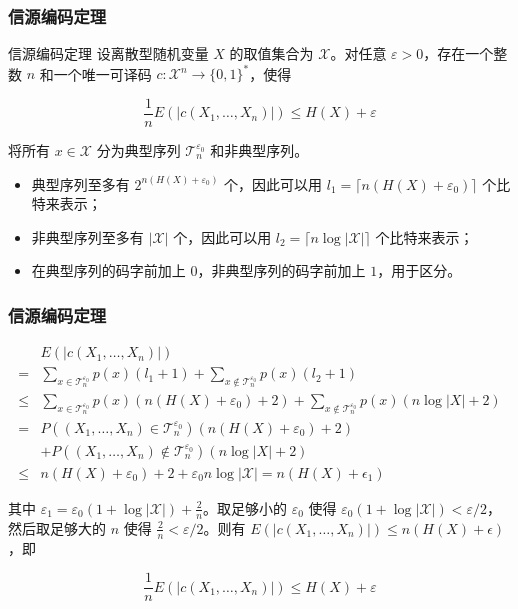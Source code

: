 \documentclass{beamer}
\begin{document}
\begin{frame}
    \frametitle{信源编码定理}

    \begin{block}{信源编码定理}
        设离散型随机变量 $X$ 的取值集合为 $\mathcal{X}$。对任意 $\varepsilon > 0$，存在一个整数 $n$ 和一个唯一可译码 $c: \mathcal{X}^n \rightarrow \{0, 1\}^*$，使得

        \[\frac{1}{n}E(\lvert c(X_1, \dots, X_n)\rvert) \leq H(X) + \varepsilon\]
    \end{block}
    
    将所有 $x\in \mathcal{X}$ 分为典型序列 $\mathcal{T}_n^{\varepsilon_0}$ 和非典型序列。

    \begin{itemize}
        \item 典型序列至多有 $2^{n(H(X) + \varepsilon_0)}$ 个，因此可以用 $l_1 = \lceil n(H(X) + \varepsilon_0)\rceil$ 个比特来表示；
        \item 非典型序列至多有 $\lvert \mathcal{X}\rvert$ 个，因此可以用 $l_2 = \lceil n\log \lvert \mathcal{X}\rvert\rceil$ 个比特来表示；
        \item 在典型序列的码字前加上 $0$，非典型序列的码字前加上 $1$，用于区分。
    \end{itemize}

\end{frame}

\begin{frame}
    \frametitle{信源编码定理}

    \[\begin{split}
        & E(\lvert c(X_1, \dots, X_n)\rvert) \\
        = & \sum_{x\in\mathcal{T}_n^{\varepsilon_0}}p(x)(l_1 + 1) + \sum_{x\notin\mathcal{T}_n^{\varepsilon_0}}p(x)(l_2 + 1) \\
        \leq & \sum_{x\in\mathcal{T}_n^{\varepsilon_0}}p(x)(n(H(X) + \varepsilon_0) + 2) + \sum_{x\notin\mathcal{T}_n^{\varepsilon_0}}p(x)(n\log \lvert X\rvert + 2) \\
        = & P((X_1, \dots, X_n) \in \mathcal{T}_n^{\varepsilon_0})(n(H(X) + \varepsilon_0) + 2) \\
        & + P((X_1, \dots, X_n) \notin \mathcal{T}_n^{\varepsilon_0})(n\log \lvert X\rvert + 2) \\
        \leq & n(H(X) + \varepsilon_0) + 2 + \varepsilon_0 n\log\lvert\mathcal{X}\rvert = n(H(X) + \epsilon_1)
    \end{split}\]

    其中 $\varepsilon_1 = \varepsilon_0(1 + \log\lvert\mathcal{X}\rvert) + \frac{2}{n}$。取足够小的 $\varepsilon_0$ 使得 $\varepsilon_0(1 + \log\lvert\mathcal{X}\rvert) < \varepsilon / 2$，然后取足够大的 $n$ 使得 $\frac{2}{n} < \varepsilon / 2$。则有 $E(\lvert c(X_1, \dots, X_n)\rvert) \leq n(H(X) + \epsilon)$，即

    \[\frac{1}{n}E(\lvert c(X_1, \dots, X_n)\rvert) \leq H(X) + \varepsilon\]

\end{frame}
\end{document}
